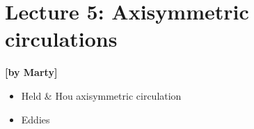 
\section{Lecture 5: Axisymmetric circulations}\label{sec:lecture5}
\begin{flushright}\textbf{[by Marty]}\end{flushright}
  
 \begin{itemize}
   \item
   Held & Hou axisymmetric circulation
   \item
   Eddies
\end{itemize}
